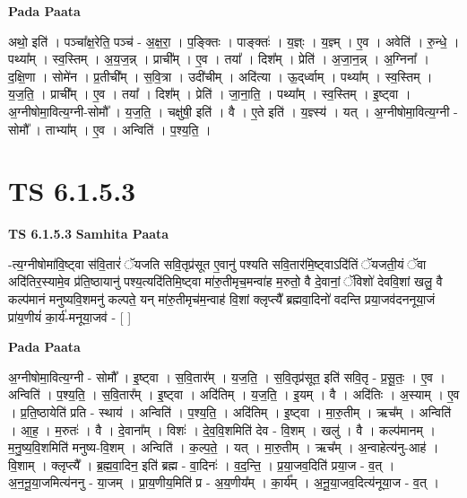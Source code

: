 \documentclass[17pt]{extarticle}
\begin{document}
\textbf{Pada Paata} \newline

अथो॒ इति॑ । पञ्चा᳚क्ष॒रेति॒ पञ्च॑ - अ॒क्ष॒रा॒ । प॒ङ्क्तिः । पाङ्क्तः॑ । य॒ज्ञ्ः । य॒ज्ञ्म् । ए॒व । अवेति॑ । रु॒न्धे॒ । पथ्या᳚म् । स्व॒स्तिम् । अ॒य॒ज॒न्न् । प्राची᳚म् । ए॒व । तया᳚ । दिश᳚म् । प्रेति॑ । अ॒जा॒न॒न्न् । अ॒ग्निना᳚ । द॒क्षि॒णा । सोमे॑न । प्र॒तीची᳚म् । स॒वि॒त्रा । उदी॑चीम् । अदि॑त्या । ऊ॒द्‌र्ध्वाम् । पथ्या᳚म् । स्व॒स्तिम् । य॒ज॒ति॒ । प्राची᳚म् । ए॒व । तया᳚ । दिश᳚म् । प्रेति॑ । जा॒ना॒ति॒ । पथ्या᳚म् । स्व॒स्तिम् । इ॒ष्ट्वा । अ॒ग्नीषोमा॒वित्य॒ग्नी-सोमौ᳚ । य॒ज॒ति॒ । चक्षु॑षी॒ इति॑ । वै । ए॒ते इति॑ । य॒ज्ञ्स्य॑ । यत् । अ॒ग्नीषोमा॒वित्य॒ग्नी - सोमौ᳚ । ताभ्या᳚म् । ए॒व । अन्विति॑ । प॒श्य॒ति॒ ।  \newline





\section{ TS 6.1.5.3 }

\textbf{TS 6.1.5.3 } \newline
\textbf{Samhita Paata} \newline

-त्य॒ग्नीषोमा॑वि॒ष्ट्वा स॑वि॒तारं॑ ॅयजति सवि॒तृप्र॑सूत ए॒वानु॑ पश्यति सवि॒तार॑मि॒ष्ट्वाऽदि॑तिं ॅयजती॒यं ॅवा अदि॑तिर॒स्यामे॒व प्र॑ति॒ष्ठायानु॑ पश्य॒त्यदि॑तिमि॒ष्ट्वा मा॑रु॒तीमृच॒मन्वा॑ह म॒रुतो॒ वै दे॒वानां॒ ॅविशो॑ देववि॒शां खलु॒ वै कल्प॑मानं मनुष्यवि॒शमनु॑ कल्पते॒ यन् मा॑रु॒तीमृच॑म॒न्वाह॑ वि॒शां क्लृप्त्यै᳚ ब्रह्मवा॒दिनो॑ वदन्ति प्रया॒जव॑दननूया॒जं प्रा॑य॒णीयं॑ का॒र्य॑-मनूया॒जव॑ - [  ] \newline

\textbf{Pada Paata} \newline

अ॒ग्नीषोमा॒वित्य॒ग्नी - सोमौ᳚ । इ॒ष्ट्वा । स॒वि॒तार᳚म् । य॒ज॒ति॒ । स॒वि॒तृप्र॑सूत॒ इति॑ सवि॒तृ - प्र॒सू॒तः॒ । ए॒व । अन्विति॑ । प॒श्य॒ति॒ । स॒वि॒तार᳚म् । इ॒ष्ट्वा । अदि॑तिम् । य॒ज॒ति॒ । इ॒यम् । वै । अदि॑तिः । अ॒स्याम् । ए॒व । प्र॒ति॒ष्ठायेति॑ प्रति - स्थाय॑ । अन्विति॑ । प॒श्य॒ति॒ । अदि॑तिम् । इ॒ष्ट्वा । मा॒रु॒तीम् । ऋच᳚म् । अन्विति॑ । आ॒ह॒ । म॒रुतः॑ । वै । दे॒वाना᳚म् । विशः॑ । दे॒व॒वि॒शमिति॑ देव - वि॒शम् । खलु॑ । वै । कल्प॑मानम् । म॒नु॒ष्य॒वि॒शमिति॑ मनुष्य-वि॒शम् । अन्विति॑ । क॒ल्प॒ते॒ । यत् । मा॒रु॒तीम् । ऋच᳚म् । अ॒न्वाहेत्य॑नु-आह॑ । वि॒शाम् । क्लृप्त्यै᳚ । ब्र॒ह्म॒वा॒दिन॒ इति॑ ब्रह्म - वा॒दिनः॑ । व॒द॒न्ति॒ । प्र॒या॒जव॒दिति॑ प्रया॒ज - व॒त् । अ॒न॒नू॒या॒जमित्य॑ननु - या॒जम् । प्रा॒य॒णीय॒मिति॑ प्र - अ॒य॒णीय᳚म् । का॒र्य᳚म् । अ॒नू॒या॒जव॒दित्य॑नूया॒ज - व॒त् ।  \newline
\end{document}
